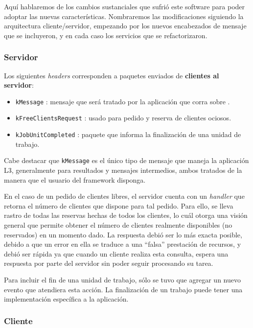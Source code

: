 Aquí hablaremos de los cambios sustanciales que sufrió este software para poder adoptar las nuevas características. Nombraremos las
modificaciones siguiendo la arquitectura cliente/servidor, empezando por los nuevos encabezados de mensaje que se incluyeron, y en cada caso
los servicios que se refactorizaron.

\subsubsection{Servidor}

Los siguientes \textit{headers} corresponden a paquetes enviados de \textbf{clientes al servidor}:
\begin{itemize}
    \item   \texttt{kMessage} : mensaje que será tratado por la aplicación que corra sobre \fud.
    \item   \texttt{kFreeClientsRequest} : usado para pedido y reserva de clientes ociosos.
    \item   \texttt{kJobUnitCompleted} : paquete que informa la finalización de una unidad de trabajo.
\end{itemize}

Cabe destacar que \texttt{kMessage} es el único tipo de mensaje que maneja la aplicación L3, generalmente para resultados y mensajes
intermedios, ambos tratados de la manera que el usuario del framework disponga.

En el caso de un pedido de clientes libres, el servidor cuenta con un \textit{handler} que retorna el número de clientes que dispone para
tal pedido. Para ello, se lleva rastro de todas las reservas hechas de todos los clientes, lo cuál otorga una visión general que permite
obtener el número de clientes realmente disponibles (no reservados) en un momento dado. La respuesta debió ser lo más exacta posible, debido
a que un error en ella se traduce a una ``falsa'' prestación de recursos, y debió ser rápida ya que cuando un cliente realiza esta consulta,
espera una respuesta por parte del servidor sin poder seguir procesando su tarea.

Para incluir el fin de una unidad de trabajo, sólo se tuvo que agregar un nuevo evento que atendiera esta acción. La finalización de un
trabajo puede tener una implementación específica a la aplicación.

\subsubsection{Cliente}

